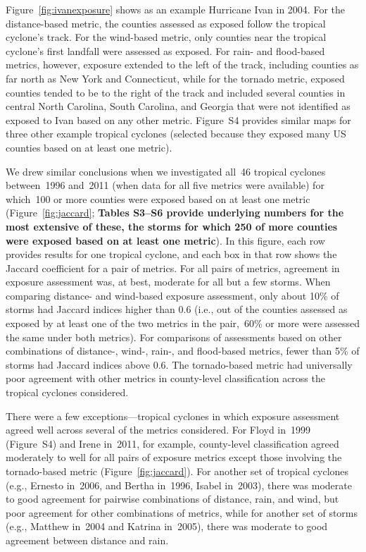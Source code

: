 Figure~\ref{fig:ivanexposure} shows as an example Hurricane Ivan in 2004.
For the distance-based metric, the counties assessed as exposed follow the
tropical cyclone's track. For the wind-based metric,
only counties near the tropical cyclone's first landfall were assessed as
exposed. For rain- and flood-based metrics, however, exposure extended to the
left of the track, including counties as far north as New York and Connecticut,
while for the tornado metric, exposed counties tended to be to the right of the
track and included several counties in central North Carolina, South Carolina,
and Georgia that were not identified as exposed to Ivan based on any other
metric. Figure~S4 provides similar maps for three other example tropical
cyclones (selected because they exposed many \ac{US}  counties based on at
least one metric).

We drew similar conclusions when we investigated all~46 tropical cyclones
between~1996 and~2011 (when data for all five metrics were available) for
which~100 or more counties were exposed based on at least one metric
(Figure~\ref{fig:jaccard}; \textbf{Tables S3--S6 provide underlying
numbers for the most extensive of these, the storms for which 250 of more
counties were exposed based on at least one metric}). In this figure, each row
provides results for one tropical cyclone, and each box in that row shows the
Jaccard coefficient for a pair of metrics. For all pairs of metrics, agreement
in exposure assessment was, at best, moderate for all but a few storms. When
comparing distance- and wind-based exposure assessment, only about 10\% of
storms had Jaccard indices higher than 0.6 (i.e., out of the counties assessed
as exposed by at least one of the two metrics in the pair,~60\si{\percent} or
more were assessed the same under both metrics). For comparisons of assessments
based on other combinations of distance-, wind-, rain-, and flood-based
metrics, fewer than 5\% of storms had Jaccard indices above 0.6.  The
tornado-based metric had universally poor agreement with other metrics in
county-level classification across the tropical cyclones considered.  

There were a few exceptions---tropical cyclones in which exposure assessment
agreed well across several of the metrics considered.  For Floyd in~1999
(Figure~S4) and Irene in~2011, for example, county-level classification agreed
moderately to well for all pairs of exposure metrics except those involving the
tornado-based metric (Figure~\ref{fig:jaccard}). For another set of tropical
cyclones (e.g., Ernesto in~2006, and Bertha in~1996, Isabel in~2003), there was
moderate to good agreement for pairwise combinations of distance, rain, and
wind, but poor agreement for other combinations of metrics, while for another
set of storms (e.g., Matthew in~2004 and Katrina in~2005), there was moderate
to good agreement between distance and rain.  



